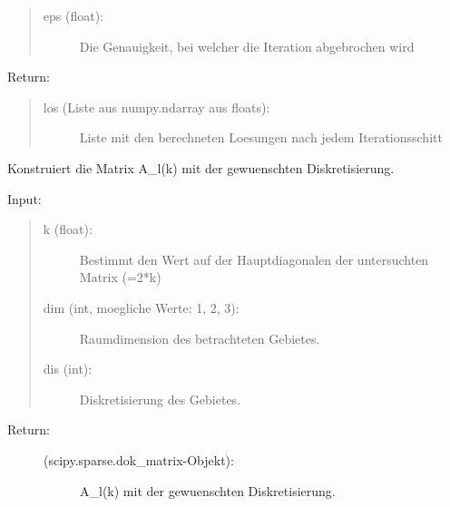 \documentclass[letterpaper,10pt,ngerman]{sphinxmanual}
\begin{document}
\begin{fulllineitems}
\begin{fulllineitems}
\begin{quote}
\begin{description}
\item[{eps (float):}] \leavevmode
Die Genauigkeit, bei welcher die Iteration abgebrochen wird

\end{description}
\end{quote}

Return:
\begin{quote}
\begin{description}
\item[{los (Liste aus numpy.ndarray aus floats):}] \leavevmode
Liste mit den berechneten Loesungen nach jedem Iterationsschitt

\end{description}
\end{quote}

\end{fulllineitems}


\begin{fulllineitems}
\label{\detokenize{index:sparse_erw.Sparse.constr_mat_l_k}}
Konstruiert die Matrix A\_l(k) mit der gewuenschten Diskretisierung.

Input:
\begin{quote}
\begin{description}
\item[{k (float):}] \leavevmode
Bestimmt den Wert auf der Hauptdiagonalen der untersuchten Matrix (=2*k)

\item[{dim (int, moegliche Werte: 1, 2, 3):}] \leavevmode
Raumdimension des betrachteten Gebietes.

\item[{dis (int):}] \leavevmode
Diskretisierung des Gebietes.

\end{description}
\end{quote}
\begin{description}
\item[{Return:}] \leavevmode\begin{description}
\item[{(scipy.sparse.dok\_matrix-Objekt):}] \leavevmode
A\_l(k) mit der gewuenschten Diskretisierung.

\end{description}

\end{description}


\end{fulllineitems}
\end{fulllineitems}
\end{document}
